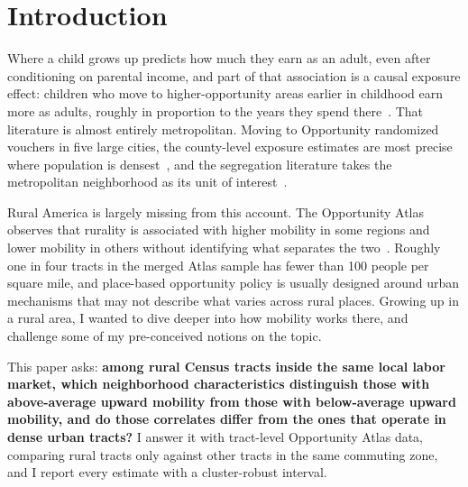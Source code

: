 \documentclass[9pt,twoside]{pnas-new}
\begin{document}

\maketitle
\thispagestyle{firststyle}

\Firstpage

\section{Introduction}

Where a child grows up predicts how much they earn as an adult, even after
conditioning on parental income, and part of that association is a causal
exposure effect: children who move to higher-opportunity areas earlier in
childhood earn more as adults, roughly in proportion to the years they spend
there~\cite{chetty2015mto,chetty2017exposure}. That literature is almost
entirely metropolitan. Moving to Opportunity randomized vouchers in five large
cities, the county-level exposure estimates are most precise where population
is densest~\cite{chetty2018county}, and the segregation literature takes the
metropolitan neighborhood as its unit of interest~\cite{reardonbischoff2011}.

Rural America is largely missing from this account. The Opportunity Atlas
observes that rurality is associated with higher mobility in some regions and
lower mobility in others without identifying what separates the
two~\cite{chetty2018atlas}. Roughly one in four tracts in the merged Atlas
sample has fewer than 100 people per square mile, and place-based opportunity
policy is usually designed around urban mechanisms that may not describe what
varies across rural places. Growing up in a rural area, I wanted to dive deeper
into how mobility works there, and challenge some of my pre-conceived notions
on the topic.

This paper asks: \textbf{among rural Census
tracts inside the same local labor market, which neighborhood characteristics
distinguish those with above-average upward mobility from those with
below-average upward mobility, and do those correlates differ from the ones
that operate in dense urban tracts?} I answer it with tract-level Opportunity
Atlas data, comparing rural tracts only against other tracts in the same
commuting zone, and I report every estimate with a cluster-robust interval.
\end{document}
